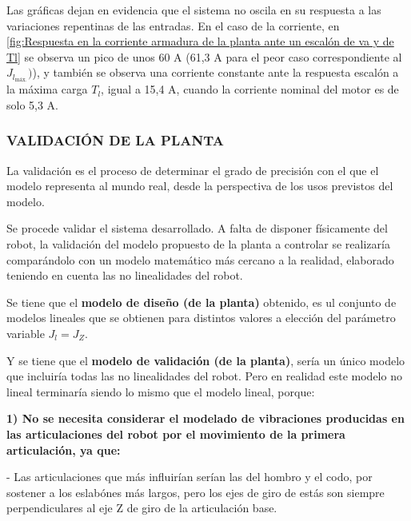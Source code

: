 \documentclass{article}
\begin{document}
\begin{sloppypar}
Las gráficas dejan en evidencia que el sistema no oscila en su respuesta a las variaciones repentinas de las entradas.
En el caso de la corriente, en \ref{fig:Respuesta en la corriente armadura de la planta ante un escalón de va y de Tl} se observa un pico de unos 60 A (61,3 A para el peor caso correspondiente al $J_{l_{\text{máx.}}})$), y también se observa una corriente constante ante la respuesta escalón a la máxima carga $T_l$, igual a 15,4 A, cuando la corriente nominal del motor es de solo 5,3 A.

\subsubsection{VALIDACIÓN DE LA PLANTA}
\label{sec:VALIDACIÓN DE LA PLANTA}

La validación es el proceso de determinar el grado de precisión con el que el modelo representa al mundo real, desde la perspectiva de los usos previstos del modelo.

Se procede validar el sistema desarrollado. A falta de disponer físicamente del robot, la validación del modelo propuesto de la planta a controlar se realizaría comparándolo con un modelo matemático más cercano a la realidad, elaborado teniendo en cuenta las no linealidades del robot.

Se tiene que el \textbf{modelo de diseño (de la planta)} obtenido, es ul conjunto de modelos lineales que se obtienen para distintos valores a elección del parámetro variable $J_l=J_Z$.

Y se tiene que el \textbf{modelo de validación (de la planta)}, sería un único modelo que incluiría todas las no linealidades del robot. Pero en realidad este modelo no lineal terminaría siendo lo mismo que el modelo lineal, porque:

\textbf{1) No se necesita considerar el modelado de vibraciones producidas en las articulaciones del robot por el movimiento de la primera articulación, ya que:}

- Las articulaciones que más influirían serían las del hombro y el codo, por sostener a los eslabónes más largos, pero los ejes de giro de estás son siempre perpendiculares al eje Z de giro de la articulación base.


\end{sloppypar}
\end{document}

